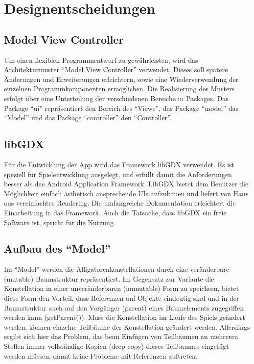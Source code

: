 \chapter{Designentscheidungen}

\section{Model View Controller}
Um einen flexiblen Programmentwurf zu gewährleisten, wird das Architekturmuster "`Model View Controller"' verwendet.
Dieses soll spätere Änderungen und Erweiterungen erleichtern, sowie eine Wiederverwendung der einzelnen Programmkomponenten ermöglichen.
Die Realisierung des Musters erfolgt über eine Unterteilung der verschiedenen Bereiche in Packages.
 Das Package "`ui"' repräsentiert den Bereich des "`Views"', das Package "`model"' das "`Model"' und das Package "`controller"' den "`Controller"'.


\section{libGDX}
Für die Entwicklung der App wird das Framework libGDX verwendet.
Es ist speziell für Spielentwicklung ausgelegt, und erfüllt damit die Anforderungen besser als das Android Application Framework.
 LibGDX bietet dem Benutzer die Möglichkeit einfach ästhetisch ansprechende UIs aufzubauen und liefert von Haus aus vereinfachtes Rendering.
Die umfangreiche Dokumentation erleichtert die Einarbeitung in das Framework.
Auch die Tatsache, dass libGDX ein freie Software ist, spricht für die Nutzung.

\section{Aufbau des "`Model"'}
Im "`Model"' werden die Alligatorenkonstellationen durch eine veränderbare (mutable) Baumstruktur repräsentiert.
 Im Gegensatz zur Variante die Konstellation in einer unveränderbaren (immutable) Form zu speichern, bietet diese Form den Vorteil, dass Referenzen auf Objekte eindeutig sind und in der Baumstruktur auch auf den Vorgänger (parent) eines Baumelements zugegriffen werden kann (getParent()).
Muss die Konstellation im Laufe des Spiels geändert werden, können einzelne Teilbäume der Konstellation geändert werden.
Allerdings ergibt sich hier das Problem, das beim Einfügen von Teilbäumen an mehreren Stellen immer vollständige Kopien (deep copy) dieses Teilbaumes eingefügt werden müssen, damit keine Probleme mit Referenzen auftreten.

